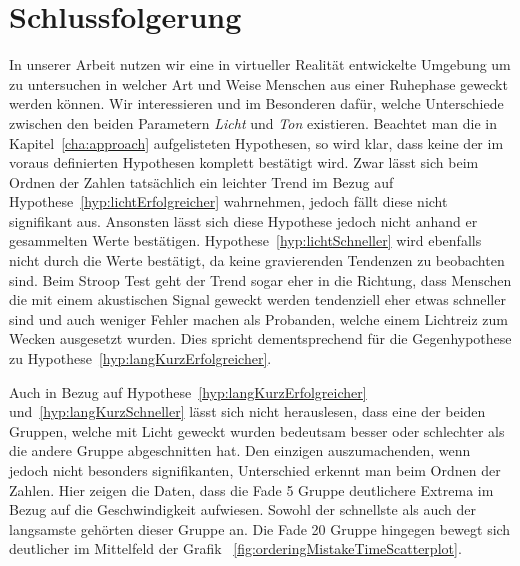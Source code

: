 \chapter{Schlussfolgerung}


In unserer Arbeit nutzen wir eine in virtueller Realität entwickelte Umgebung um zu untersuchen in welcher Art und Weise Menschen aus einer Ruhephase geweckt werden können.
Wir interessieren und im Besonderen dafür, welche Unterschiede zwischen den beiden Parametern \textit{Licht} und \textit{Ton} existieren. 
Beachtet man die in Kapitel~\ref{cha:approach} aufgelisteten Hypothesen, so wird klar, dass keine der im voraus definierten Hypothesen komplett bestätigt wird. 
Zwar lässt sich beim Ordnen der Zahlen tatsächlich ein leichter Trend im Bezug auf Hypothese~\ref{hyp:lichtErfolgreicher} wahrnehmen, jedoch fällt diese nicht signifikant aus. 
Ansonsten lässt sich diese Hypothese jedoch nicht anhand er gesammelten Werte bestätigen. 
Hypothese~\ref{hyp:lichtSchneller} wird ebenfalls nicht durch die Werte bestätigt, da keine gravierenden Tendenzen zu beobachten sind.
Beim Stroop Test geht der Trend sogar eher in die Richtung, dass Menschen die mit einem akustischen Signal geweckt werden tendenziell eher etwas schneller sind und auch weniger Fehler machen als Probanden, welche einem Lichtreiz zum Wecken ausgesetzt wurden.
Dies spricht dementsprechend für die Gegenhypothese zu Hypothese~\ref{hyp:langKurzErfolgreicher}.

Auch in Bezug auf Hypothese~\ref{hyp:langKurzErfolgreicher} und~\ref{hyp:langKurzSchneller} lässt sich nicht herauslesen, dass eine der beiden Gruppen, welche mit Licht geweckt wurden bedeutsam besser oder schlechter als die andere Gruppe abgeschnitten hat. 
Den einzigen auszumachenden, wenn jedoch nicht besonders signifikanten, Unterschied erkennt man beim Ordnen der Zahlen. 
Hier zeigen die Daten, dass die Fade 5 Gruppe deutlichere Extrema im Bezug auf die Geschwindigkeit aufwiesen. 
Sowohl der schnellste als auch der langsamste gehörten dieser Gruppe an. 
Die Fade 20 Gruppe hingegen bewegt sich deutlicher im Mittelfeld der Grafik ~\ref{fig:orderingMistakeTimeScatterplot}.


